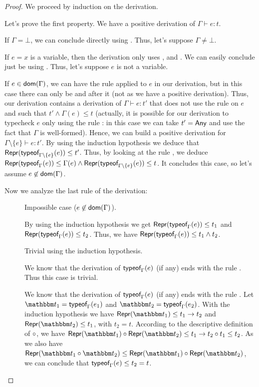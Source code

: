 \documentclass[a4paper]{article}
\theoremstyle{definition}
\begin{document}
  \begin{proof}
  We proceed by induction on the derivation.

  Let's prove the first property. We have a positive derivation of $\Gamma \vdash e:t$.

  If $\Gamma = \bot$, we can conclude directly using . Thus, let's suppose $\Gamma \neq \bot$.

  If $e=x$ is a variable, then the derivation only uses ,  and .
  We can easily conclude just be using . Thus, let's suppose $e$ is not a variable.

  If $e\in\textsf{dom}(\Gamma)$, we can have the rule  applied to $e$ in our derivation, but in this case
  there can only be  and  after it (not  as we have a positive derivation).
  Thus, our derivation contains a derivation of $\Gamma \vdash e:t'$ that does not use the rule  on $e$
  and such that $t'\land \Gamma(e) \leq t$ (actually, it is possible for our derivation to typecheck $e$ only using the rule :
  in this case we can take $t'=\textsf{Any}$ and use the fact that $\Gamma$ is well-formed).
  Hence, we can build a positive derivation for $\Gamma\setminus\{e\} \vdash e:t'$.
  By using the induction hypothesis we deduce that $\textsf{Repr}(\textsf{typeof}_{\Gamma\setminus\{e\}}(e)) \leq t'$.
  Thus, by looking at the rule ,
  we deduce $\textsf{Repr}(\textsf{typeof}_{\Gamma}(e)) \leq \Gamma(e) \land \textsf{Repr}(\textsf{typeof}_{\Gamma\setminus\{e\}}(e)) \leq t$.
  It concludes this case, so let's assume $e\not\in\textsf{dom}(\Gamma)$.

  Now we analyze the last rule of the derivation:

  \begin{description}
    \item[] Impossible case ($e\not\in\textsf{dom}(\Gamma)$).
    \item[] By using the induction hypothesis we get $\textsf{Repr}(\textsf{typeof}_{\Gamma}(e)) \leq t_1$ and $\textsf{Repr}(\textsf{typeof}_{\Gamma}(e)) \leq t_2$.
    Thus, we have $\textsf{Repr}(\textsf{typeof}_{\Gamma}(e)) \leq t_1 \land t_2$. 
    \item[] Trivial using the induction hypothesis.
    \item[] We know that the derivation of $\textsf{typeof}_{\Gamma}(e)$ (if any) ends with the rule .
    Thus this case is trivial.
    \item[] We know that the derivation of $\textsf{typeof}_{\Gamma}(e)$ (if any) ends with the rule .
    Let $\ts_1 = \tyof {e_1} \Gamma$ and $\ts_2 = \tyof {e_2} \Gamma$. 
    With the induction hypothesis we have $\tsrep {\ts_1} \leq \arrow {t_1} {t_2}$ and $\tsrep {\ts_2} \leq t_1$, with $t_2=t$.
    According to the descriptive definition of $\circ$, we have
    $\apply{\tsrep {\ts_1}}{\tsrep {\ts_2}} \leq \apply{\arrow {t_1}{t_2}}{t_1} \leq t_2$.
    As we also have $\tsrep{\apply {\ts_1} {\ts_2}} \leq \apply{\tsrep {\ts_1}}{\tsrep {\ts_2}}$,
    we can conclude that $\textsf{typeof}_{\Gamma}(e) \leq t_2=t$.


\end{description}
\end{proof}
\end{document}
